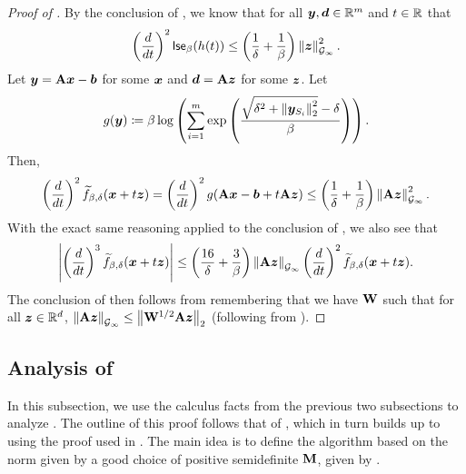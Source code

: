 \begin{proof}[Proof of ]
By the conclusion of , we know that for all $\bm{y}, \bm{d} \in \mathbb{R}^m$ and $t\in\mathbb{R}$ that
\begin{align*}
    \left(\frac{d}{dt}\right)^2 \mathsf{lse}_{\beta}(h(t)) \le \left(\frac{1}{\delta}+\frac{1}{\beta}\right)\left\lVert \bm{z} \right\rVert_{\mathcal{G}_{\infty}}^2.
\end{align*}
Let $\bm{y} = \mathbf{A}\bm{x} - \bm{b}$ for some $\bm{x}$ and $\bm{d} = \mathbf{A}\bm{z}$ for some $\bm{z}$. Let
\begin{align*}
    g(\bm{y}) \coloneqq \beta\log\left(\sum_{i=1}^m \mathrm{exp}\left(\frac{\sqrt{\delta^2+\left\lVert \bm{y}_{S_i} \right\rVert_2^2}-\delta}{\beta}\right)\right).
\end{align*}
Then,
\begin{align*}
    \left(\frac{d}{dt}\right)^2 \widetilde{f}_{\beta,\delta}(\bm{x}+t\bm{z}) = \left(\frac{d}{dt}\right)^2 g(\mathbf{A}\bm{x} - \bm{b} + t\mathbf{A}\bm{z}) \le \left(\frac{1}{\delta}+\frac{1}{\beta}\right)\left\lVert \mathbf{A}\bm{z} \right\rVert_{\mathcal{G}_{\infty}}^2.
\end{align*}
With the exact same reasoning applied to the conclusion of , we also see that
\begin{align*}
    \left\lvert \left(\frac{d}{dt}\right)^3 \widetilde{f}_{\beta,\delta}(\bm{x}+t\bm{z}) \right\rvert \le \left(\frac{16}{\delta}+\frac{3}{\beta}\right)\left\lVert \mathbf{A}\bm{z} \right\rVert_{\mathcal{G}_{\infty}}\left(\frac{d}{dt}\right)^2 \widetilde{f}_{\beta,\delta}(\bm{x}+t\bm{z}).
\end{align*}
The conclusion of  then follows from remembering that we have $\mathbf{W}$ such that for all $\bm{z}\in\mathbb{R}^d$, $\left\lVert \mathbf{A}\bm{z} \right\rVert_{\mathcal{G}_{\infty}} \le \left\lVert \mathbf{W}^{1/2}\mathbf{A}\bm{z} \right\rVert_2$ (following from ).
\end{proof}

\subsection{Analysis of \texorpdfstring{}{Algorithm 1}}
\label{sec:gp_robust_analysis_combining}

In this subsection, we use the calculus facts from the previous two subsections to analyze . The outline of this proof follows that of \cite[Theorem 2]{jls21}, which in turn builds up to using the proof used in \cite[Corollary 12]{msbacon}. The main idea is to define the algorithm based on the norm given by a good choice of positive semidefinite $\mathbf{M}$, given by .

